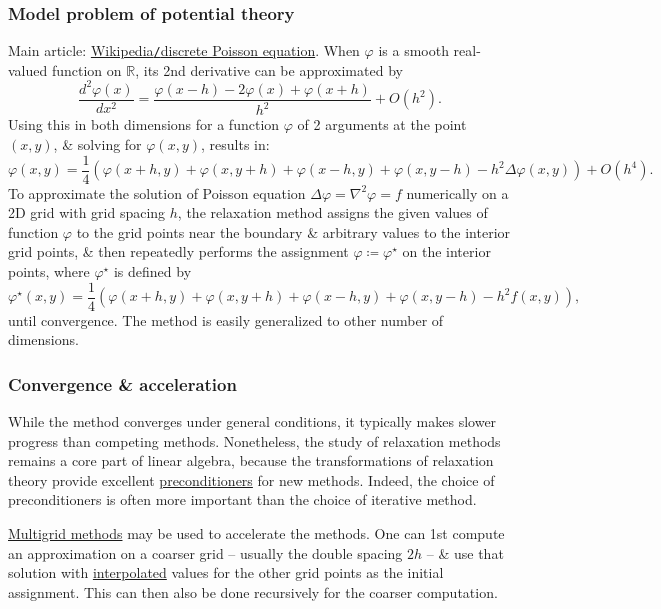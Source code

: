\documentclass{article}
\begin{document}
\subsubsection{Model problem of potential theory}
Main article: \href{https://en.wikipedia.org/wiki/Discrete_Poisson_equation}{Wikipedia{\tt/}discrete Poisson equation}. When $\varphi$ is a smooth real-valued function on $\mathbb{R}$, its 2nd derivative can be approximated by
\begin{equation}
	\frac{d^2\varphi(x)}{dx^2} = \frac{\varphi(x - h) - 2\varphi(x) + \varphi(x + h)}{h^2} + O(h^2).
\end{equation}
Using this in both dimensions for a function $\varphi$ of 2 arguments at the point $(x,y)$, \& solving for $\varphi(x,y)$, results in:
\begin{equation}
	\varphi(x,y) = \frac{1}{4}\left(\varphi(x + h,y) + \varphi(x,y + h) + \varphi(x - h,y) + \varphi(x,y - h) - h^2\Delta\varphi(x,y)\right) + O(h^4).
\end{equation}
To approximate the solution of Poisson equation $\Delta\varphi = \nabla^2\varphi = f$ numerically on a 2D grid with grid spacing $h$, the relaxation method assigns the given values of function $\varphi$ to the grid points near the boundary \& arbitrary values to the interior grid points, \& then repeatedly performs the assignment $\varphi\coloneqq\varphi^\star$ on the interior points, where $\varphi^\star$ is defined by
\begin{equation}
	\varphi^\star(x,y) = \frac{1}{4}\left(\varphi(x + h,y) + \varphi(x,y + h) + \varphi(x - h,y) + \varphi(x,y - h) - h^2f(x,y)\right),
\end{equation}
until convergence. The method is easily generalized to other number of dimensions.

\subsubsection{Convergence \& acceleration}
While the method converges under general conditions, it typically makes slower progress than competing methods. Nonetheless, the study of relaxation methods remains a core part of linear algebra, because the transformations of relaxation theory provide excellent \href{https://en.wikipedia.org/wiki/Preconditioner}{preconditioners} for new methods. Indeed, the choice of preconditioners is often more important than the choice of iterative method.

\href{https://en.wikipedia.org/wiki/Multigrid_methods}{Multigrid methods} may be used to accelerate the methods. One can 1st compute an approximation on a coarser grid -- usually the double spacing $2h$ -- \& use that solution with \href{https://en.wikipedia.org/wiki/Interpolation}{interpolated} values for the other grid points as the initial assignment. This can then also be done recursively for the coarser computation.
\end{document}
